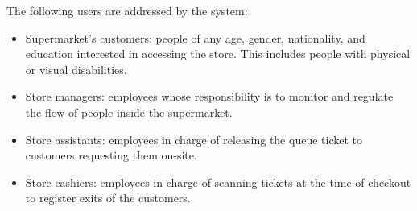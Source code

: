 \documentclass[../../main.tex]{subfiles}
\begin{document}
	The following users are addressed by the system:
	\begin{itemize}
		\item Supermarket's customers: people of any age, gender, nationality, and education interested in accessing the store. This includes people with physical or visual disabilities.
		\item Store managers: employees whose responsibility is to monitor and regulate the flow of people inside the supermarket.
		\item Store assistants: employees in charge of releasing the queue ticket to customers requesting them on-site.
		\item Store cashiers: employees in charge of scanning tickets at the time of checkout to register exits of the customers.
	\end{itemize}
\end{document}
